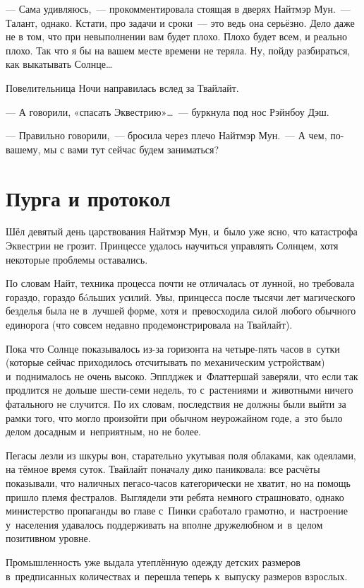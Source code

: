 \documentclass[twoside,a5paper,12pt]{extbook}
\begin{document}
— Сама удивляюсь, — прокомментировала стоящая в дверях Найтмэр Мун. — Талант, однако. Кстати, про задачи и сроки — это ведь она серьёзно. Дело даже не в том, что при невыполнении вам будет плохо. Плохо будет всем, и реально плохо. Так что я бы на вашем месте времени не теряла. Ну, пойду разбираться, как выкатывать Солнце…

Повелительница Ночи направилась вслед за Твайлайт.

— А говорили, «спасать Эквестрию»… — буркнула под нос Рэйнбоу Дэш.

— Правильно говорили, — бросила через плечо Найтмэр Мун. — А чем, по-вашему, мы с вами тут сейчас будем заниматься?

\chapter{Пурга и протокол}

Шёл девятый день царствования Найтмэр Мун, и было уже ясно, что катастрофа Эквестрии не грозит. Принцессе удалось научиться управлять Солнцем, хотя некоторые проблемы оставались.

По словам Найт, техника процесса почти не отличалась от лунной, но требовала гораздо, гораздо бóльших усилий. Увы, принцесса после тысячи лет магического безделья была не в лучшей форме, хотя и превосходила силой любого обычного единорога (что совсем недавно продемонстрировала на Твайлайт).

Пока что Солнце показывалось из-за горизонта на четыре-пять часов в сутки (которые сейчас приходилось отсчитывать по механическим устройствам) и поднималось не очень высоко. Эпплджек и Флаттершай заверяли, что если так продлится не дольше шести-семи недель, то с растениями и животными ничего фатального не случится. По их словам, последствия не должны были выйти за рамки того, что могло произойти при обычном неурожайном годе, а это было делом досадным и неприятным, но не более.

Пегасы лезли из шкуры вон, старательно укутывая поля облаками, как одеялами, на тёмное время суток. Твайлайт поначалу дико паниковала: все расчёты показывали, что наличных пегасо-часов категорически не хватит, но на помощь пришло племя фестралов. Выглядели эти ребята немного страшновато, однако министерство пропаганды во главе с Пинки сработало грамотно, и настроение у населения удавалось поддерживать на вполне дружелюбном и в целом позитивном уровне.

Промышленность уже выдала утеплённую одежду детских размеров в предписанных количествах и перешла теперь к выпуску размеров взрослых.
\end{document}
